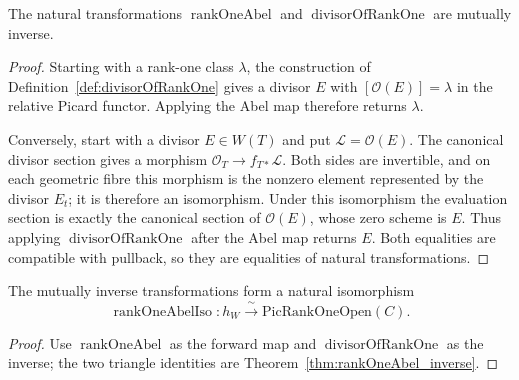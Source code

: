 \begin{theorem}
  \label{thm:rankOneAbel_inverse}
  \notready
  The natural transformations \(\operatorname{rankOneAbel}\) and
  \(\operatorname{divisorOfRankOne}\) are mutually inverse.
\end{theorem}
\begin{proof}
  Starting with a rank-one class \(\lambda\), the construction of
  Definition~\ref{def:divisorOfRankOne} gives a divisor \(E\) with
  \([\mathcal O(E)]=\lambda\) in the relative Picard functor.  Applying the Abel map therefore
  returns \(\lambda\).

  Conversely, start with a divisor \(E\in W(T)\) and put
  \(\mathcal L=\mathcal O(E)\).  The canonical divisor section gives a morphism
  \(\mathcal O_T\to f_{T*}\mathcal L\).  Both sides are invertible, and on each geometric
  fibre this morphism is the nonzero element represented by the divisor \(E_t\); it is
  therefore an isomorphism.  Under this isomorphism the evaluation section is exactly the
  canonical section of \(\mathcal O(E)\), whose zero scheme is \(E\).  Thus applying
  \(\operatorname{divisorOfRankOne}\) after the Abel map returns \(E\).  Both equalities are
  compatible with pullback, so they are equalities of natural transformations.
\end{proof}

\begin{definition}
  \label{def:rankOneAbelIso}
  \leanok
  The mutually inverse transformations form a natural isomorphism
  \[
    \operatorname{rankOneAbelIso}\colon
      h_W\xrightarrow{\ \sim\ }\mathrm{PicRankOneOpen}(C).
  \]
\end{definition}
\begin{proof}
  \leanok
  Use \(\operatorname{rankOneAbel}\) as the forward map and
  \(\operatorname{divisorOfRankOne}\) as the inverse; the two triangle identities are
  Theorem~\ref{thm:rankOneAbel_inverse}.
\end{proof}

